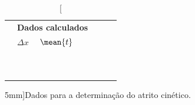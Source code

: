 \begin{table}[!ht]
\begin{tabular}{lp{25mm}p{25mm}p{25mm}p{25mm}p{25mm}l}
	\cmidrule{2-6}
\\
	& \multicolumn{3}{l}{\textbf{Dados calculados}} \\
	\cmidrule{2-3}
	& $\Delta x$ & $\mean{t}$ \\
	\cmidrule{2-3}
	& \cellcolor[gray]{0.89} & \cellcolor[gray]{0.92}  \\ 
	& \cellcolor[gray]{0.95} & \cellcolor[gray]{0.97}  \\ 
	& \cellcolor[gray]{0.89} & \cellcolor[gray]{0.92}  \\ 
	& \cellcolor[gray]{0.95} & \cellcolor[gray]{0.97}  \\ 
	& \cellcolor[gray]{0.89} & \cellcolor[gray]{0.92}  \\ 
	& \cellcolor[gray]{0.95} & \cellcolor[gray]{0.97}  \\ 
	& \cellcolor[gray]{0.89} & \cellcolor[gray]{0.92}  \\ 
	& \cellcolor[gray]{0.95} & \cellcolor[gray]{0.97}  \\ 
	& \cellcolor[gray]{0.89} & \cellcolor[gray]{0.92}  \\ 
	& \cellcolor[gray]{0.95} & \cellcolor[gray]{0.97}  \\ 
	\cmidrule{2-3}
\bottomrule
\end{tabular}
\caption[][5mm]{Dados para a determinação do atrito cinético.}
\label{DadosAtritoCinetico}
\end{table}
